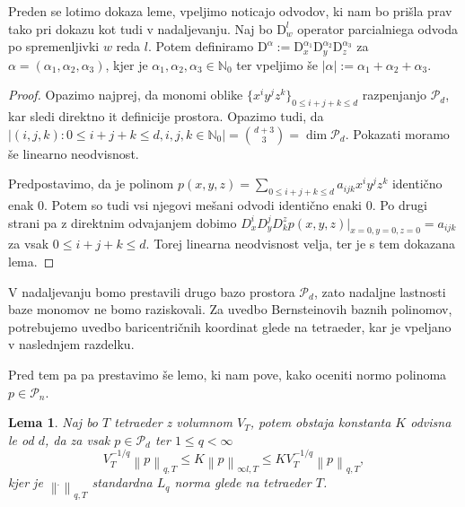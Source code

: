 \documentclass[11pt,a4paper]{article}
\newtheorem{lemma}{Lema}
\begin{document}
Preden se lotimo dokaza leme, vpeljimo noticajo odvodov, 
ki nam bo prišla prav tako pri dokazu kot tudi 
v nadaljevanju. Naj bo $\text{D}^l_w$ operator parcialniega odvoda po
spremenljivki $w$ reda $l$. Potem definiramo 
$\text{D}^\alpha := \text{D}^{\alpha_1}_x \text{D}^{\alpha_2}_y \text{D}^{\alpha_3}_z$
za $\alpha = \left(\alpha_1 , \alpha_2 , \alpha_3 \right)$,
kjer je $\alpha_1,\alpha_2, \alpha_3 \in \mathbb{N}_0$ 
ter vpeljimo še $|\alpha| := \alpha_1 + \alpha_2 + \alpha_3$.

\begin{proof}
    Opazimo najprej, da monomi oblike $\{x^i y^j z^k\}_{0 \le i  + j + k \le d}$
    razpenjanjo $\mathcal{P}_d$, kar sledi direktno it definicije 
    prostora. Opazimo tudi, da 
    $|\left(i, j , k\right): 0\le i+j+k \le d , i,j,k \in \mathbb{N}_0| = \binom{d+3}{3} = \dim\mathcal{P}_d$.
    Pokazati moramo še linearno neodvisnost.  

    Predpostavimo, da je polinom $p(x,y,z) =\sum_{0 \le i  + j + k \le d} a_{ijk} x^i y^j z^k $
    identično enak 0. Potem so tudi vsi njegovi mešani odvodi identično enaki 0.
    Po drugi strani pa z direktnim odvajanjem dobimo
    $D^i_xD^j_yD^z_k p(x,y,z)|_{x =0 ,y =0, z = 0} = a_{ijk}$ za vsak 
    $0 \le i  + j + k \le d$. Torej linearna neodvisnost velja, ter
    je s tem dokazana lema.
\end{proof}

V nadaljevanju bomo prestavili drugo bazo prostora $\mathcal{P}_d$, zato 
nadaljne lastnosti baze monomov ne bomo raziskovali. Za uvedbo Bernsteinovih
baznih polinomov, potrebujemo uvedbo baricentričnih koordinat glede na 
tetraeder, kar je vpeljano v naslednjem razdelku.

Pred tem pa pa prestavimo še lemo, ki nam pove, kako oceniti 
normo polinoma $p \in \mathcal{P}_n$.

\begin{lemma}\label{lema_norma}
    Naj bo $T$ tetraeder z volumnom $V_T$, potem obstaja 
    konstanta $K$ odvisna le od $d$, da za vsak  $p \in \mathcal{P}_d$ ter $1 \le q < \infty$
    \begin{equation}
        V_T^{-1/q} \left\lVert p \right\rVert_{q,T} \le K \left\lVert p \right\rVert_{\infty l, T} \le K V_T^{-1/q} \left\lVert p \right\rVert_{q,T},
    \end{equation}
    kjer je $\left\lVert \dot{} \right\rVert_{q,T}$ standardna $L_q$ norma 
    glede na tetraeder $T$.
\end{lemma}
\end{document}
